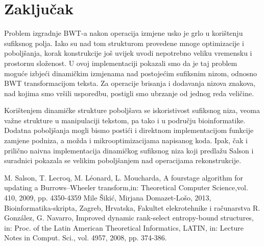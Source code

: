 \documentclass{ferseminar}
\begin{document}
\section{Zaključak}
Problem izgradnje BWT-a nakon operacija izmjene usko je grlo u korištenju sufiksnog polja. Iako su nad tom strukturom provedene mnoge optimizacije i poboljšanja, korak konstrukcije još uvijek uvodi nepotrebno veliku vremensku i prostornu složenost. U ovoj implementaciji pokazali smo da je taj problem moguće izbjeći dinamičkim izmjenama nad postojećim sufiksnim nizom, odnosno BWT transformacijom teksta. Za operacije brisanja i dodavanja nizova znakova, nad kojima smo vršili usporedbu, postigli smo ubrzanje od jednog reda veličine.

Korištenjem dinamičke strukture poboljšava se iskoristivost sufiksnog niza, veoma važne strukture u manipulaciji tekstom, pa tako i u području bioinformatike. Dodatna poboljšanja mogli bismo postići i direktnom implementacijom funkcije zamjene podniza, a možda i mikrooptimizacijama napisanog koda. Ipak, čak i prilično naivna implementacija dinamičkog sufiksnog niza koji predlažu Salson i suradnici pokazala se velikim poboljšanjem nad operacijama rekonstrukcije.

\begin{thebibliography}{1}

  	 M. Salson, T. Lecroq, M. Léonard, L. Moucharda,  A fourstage algorithm for updating a Burrows–Wheeler transform,in: Theoretical Computer Science,vol. 410, 2009, pp. 4350-4359 
	 Mile Šikić, Mirjana Domazet-Lošo, 2013, Bioinformatika-skripta, Zagreb, Hrvatska,  Fakultet elekrotehnike i računarstva
	 R. González, G. Navarro, Improved dynamic rank-select entropy-bound structures, in: Proc. of the Latin American Theoretical Informatics, LATIN, in: Lecture Notes in Comput. Sci., vol. 4957, 2008, pp. 374-386.
\end{thebibliography}
\end{document}
